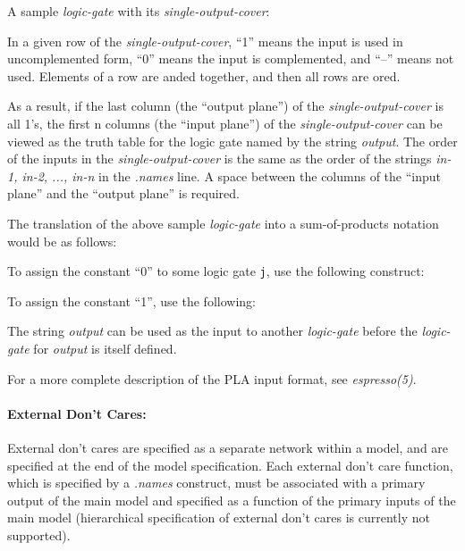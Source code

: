 {\begin{pespace}
A sample {\em logic-gate} with its {\em single-output-cover}:

In a given row of the {\em single-output-cover}, ``1'' means the input is
used in uncomplemented form, ``0'' means the input is complemented, and
``--'' means not used.  Elements of a row are {\sc and}ed together, and then
all rows are {\sc or}ed.  

As a result, if the last column (the ``output plane'') of the {\em
single-output-cover} is all 1's, the first n columns (the ``input plane'')
of the {\em single-output-cover} can be viewed as the truth table for the
logic gate named by the string {\em output}.  The order of the inputs in the
{\em single-output-cover} is the same as the order of the strings {\em in-1,
in-2, ..., in-n} in the {\em .names} line.  A space between the columns of
the ``input plane'' and the ``output plane'' is required.

The translation of the above sample {\em logic-gate} into a sum-of-products
notation would be as follows:
To assign the constant ``0'' to some logic gate {\verb|j|}, use the
following construct:
To assign the constant ``1'', use the following:

The string {\em output} can be used as the input to another {\em logic-gate}
before the {\em logic-gate} for {\em output} is itself defined.  

For a more complete description of the PLA input format, see {\em
espresso(5)}.

\paragraph{External Don't Cares:}

External don't cares are specified as a separate network within
a model, and are specified at the end of the model specification.
Each external don't care function, which is specified by a {\em .names}
construct, must be associated with a primary
output of the main model and specified as a function
of the primary inputs of the main model (hierarchical specification
of external don't cares is currently not supported).


\end{pespace}}
